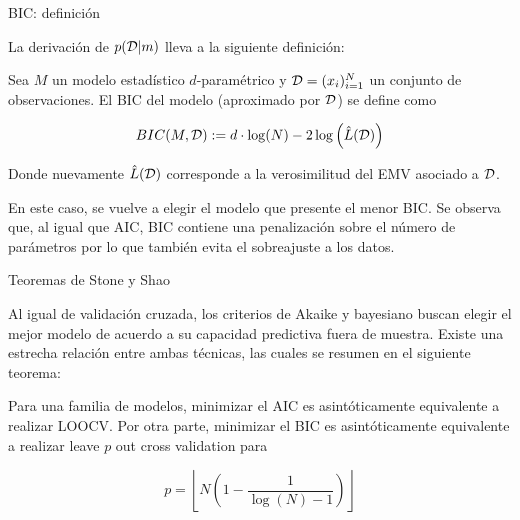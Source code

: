 \documentclass[handout, 9pt]{beamer}
\begin{document}
\begin{frame}{BIC: definición}

La derivación de $p({\mathcal D}|m)$ lleva a la siguiente definición:

\begin{definition}[BIC]
	Sea $M$ un modelo estadístico $d$-paramétrico y ${\mathcal D}=(x_i)_{i=1}^N$ un conjunto de observaciones. El BIC del modelo (aproximado por ${\mathcal D}$) se define como
	
	\begin{equation*}
		BIC(M,{\mathcal D}):= d\cdot\log(N) - 2\log\left(\hat{L}({\mathcal D})\right)
	\end{equation*}
	
	Donde nuevamente $\hat{L}({\mathcal D})$ corresponde a la verosimilitud del EMV asociado a ${\mathcal D}$.
\end{definition}\pause

En este caso, se vuelve a elegir el modelo que presente el menor BIC. Se observa que, al igual que AIC, BIC contiene una penalización sobre el número de parámetros por lo que también evita el sobreajuste a los datos.

\end{frame}

\begin{frame}{Teoremas de Stone y Shao}

Al igual de validación cruzada, los criterios de Akaike y bayesiano buscan elegir el mejor modelo de acuerdo a su capacidad predictiva fuera de muestra. Existe una estrecha relación entre ambas técnicas, las cuales se resumen en el siguiente teorema:

\begin{theorem} Para una familia de modelos, minimizar el AIC es asintóticamente equivalente a realizar LOOCV. Por otra parte, minimizar el BIC es asintóticamente equivalente a realizar leave $p$ out cross validation para

\begin{equation*}
	p=\left\lfloor N\left(1-\frac{1}{\log(N)-1}\right)\right\rfloor
\end{equation*}
	
\end{theorem}

\end{frame}
\end{document}
